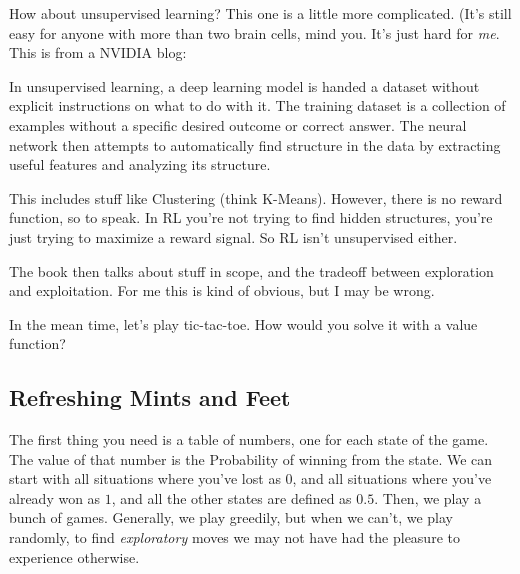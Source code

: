 \documentclass{article}
\begin{document}
How about unsupervised learning? This one is a little more complicated. (It's still easy for anyone with more than two brain cells, mind you. It's just hard for \textit{me}. This is from a NVIDIA blog: 
\begin{quoting}
In unsupervised learning, a deep learning model is handed a dataset without explicit instructions on what to do with it. The training dataset is a collection of examples without a specific desired outcome or correct answer. The neural network then attempts to automatically find structure in the data by extracting useful features and analyzing its structure.
\end{quoting}
This includes stuff like Clustering (think K-Means). However, there is no reward function, so to speak. In RL you're not trying to find hidden structures, you're just trying to maximize a reward signal. So RL isn't unsupervised either. 


The book then talks about stuff in scope, and the tradeoff between exploration and exploitation. For me this is kind of obvious, but I may be wrong. 
\bigbreak

In the mean time, let's play tic-tac-toe. How would you solve it with a value function?
\subsection{Refreshing Mints and Feet}
The first thing you need is a table of numbers, one for each state of the game. The value of that number is the Probability of winning from the state. We can start with all situations where you've lost as $0$, and all situations where you've already won as $1$, and all the other states are defined as $0.5$. Then, we play a bunch of games. Generally, we play greedily, but when we can't, we play randomly, to find \textit{exploratory} moves we may not have had the pleasure to experience otherwise. 
\end{document}
